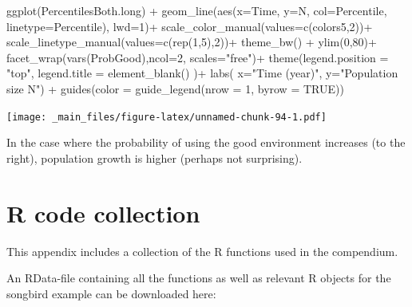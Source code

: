 \documentclass[
]{book}
\newenvironment{Shaded}{\begin{snugshade}}{\end{snugshade}}
\newcommand{\AttributeTok}[1]{\textcolor[rgb]{0.77,0.63,0.00}{#1}}
\newcommand{\ConstantTok}[1]{\textcolor[rgb]{0.00,0.00,0.00}{#1}}
\newcommand{\DecValTok}[1]{\textcolor[rgb]{0.00,0.00,0.81}{#1}}
\newcommand{\FunctionTok}[1]{\textcolor[rgb]{0.00,0.00,0.00}{#1}}
\newcommand{\NormalTok}[1]{#1}
\newcommand{\SpecialCharTok}[1]{\textcolor[rgb]{0.00,0.00,0.00}{#1}}
\newcommand{\StringTok}[1]{\textcolor[rgb]{0.31,0.60,0.02}{#1}}
\begin{document}
\begin{Shaded}
\begin{Highlighting}[]
\FunctionTok{ggplot}\NormalTok{(PercentilesBoth.long) }\SpecialCharTok{+} 
  \FunctionTok{geom\_line}\NormalTok{(}\FunctionTok{aes}\NormalTok{(}\AttributeTok{x=}\NormalTok{Time, }\AttributeTok{y=}\NormalTok{N, }\AttributeTok{col=}\NormalTok{Percentile,}
                \AttributeTok{linetype=}\NormalTok{Percentile), }\AttributeTok{lwd=}\DecValTok{1}\NormalTok{)}\SpecialCharTok{+}
  \FunctionTok{scale\_color\_manual}\NormalTok{(}\AttributeTok{values=}\FunctionTok{c}\NormalTok{(colors5,}\DecValTok{2}\NormalTok{))}\SpecialCharTok{+}
   \FunctionTok{scale\_linetype\_manual}\NormalTok{(}\AttributeTok{values=}\FunctionTok{c}\NormalTok{(}\FunctionTok{rep}\NormalTok{(}\DecValTok{1}\NormalTok{,}\DecValTok{5}\NormalTok{),}\DecValTok{2}\NormalTok{))}\SpecialCharTok{+}
  \FunctionTok{theme\_bw}\NormalTok{() }\SpecialCharTok{+}
  \FunctionTok{ylim}\NormalTok{(}\DecValTok{0}\NormalTok{,}\DecValTok{80}\NormalTok{)}\SpecialCharTok{+}
  \FunctionTok{facet\_wrap}\NormalTok{(}\FunctionTok{vars}\NormalTok{(ProbGood),}\AttributeTok{ncol=}\DecValTok{2}\NormalTok{,}
             \AttributeTok{scales=}\StringTok{"free"}\NormalTok{)}\SpecialCharTok{+}
   \FunctionTok{theme}\NormalTok{(}\AttributeTok{legend.position =} \StringTok{"top"}\NormalTok{,}
         \AttributeTok{legend.title =} \FunctionTok{element\_blank}\NormalTok{() )}\SpecialCharTok{+}
  \FunctionTok{labs}\NormalTok{( }\AttributeTok{x=}\StringTok{"Time (year)"}\NormalTok{, }\AttributeTok{y=}\StringTok{"Population size N"}\NormalTok{) }\SpecialCharTok{+}
   \FunctionTok{guides}\NormalTok{(}\AttributeTok{color =} \FunctionTok{guide\_legend}\NormalTok{(}\AttributeTok{nrow =} \DecValTok{1}\NormalTok{, }\AttributeTok{byrow =} \ConstantTok{TRUE}\NormalTok{))}
\end{Highlighting}
\end{Shaded}

\texttt{[image: \_main\_files/figure-latex/unnamed-chunk-94-1.pdf]}

In the case where the probability of using the good environment increases (to the right), population growth is higher (perhaps not surprising).

\hypertarget{s07-Code-Collection}{%
\chapter{R code collection}\label{s07-Code-Collection}}

This appendix includes a collection of the R functions used in the compendium.

An RData-file containing all the functions as well as relevant R objects for the songbird example can be downloaded here:
\end{document}
